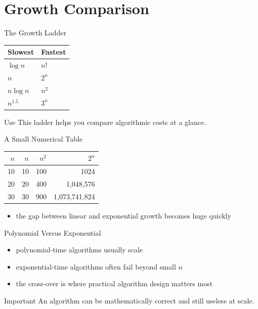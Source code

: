\documentclass[aspectratio=169,xcolor=dvipsnames]{beamer}
\begin{document}
\section{Growth Comparison}
\begin{frame}{The Growth Ladder}
  \begin{center}
  \begin{tabular}{ll}
    Slowest & Fastest \\
    \midrule
    $\log n$ & $n!$ \\
    $n$ & $2^n$ \\
    $n \log n$ & $n^2$ \\
    $n^{1.5}$ & $3^n$
  \end{tabular}
  \end{center}
  \begin{block}{Use}
    This ladder helps you compare algorithmic costs at a glance.
  \end{block}
\end{frame}

\begin{frame}{A Small Numerical Table}
  \begin{center}
  \begin{tabular}{rrrr}
    \toprule
    $n$ & $n$ & $n^2$ & $2^n$ \\
    \midrule
    10 & 10 & 100 & 1024 \\
    20 & 20 & 400 & 1,048,576 \\
    30 & 30 & 900 & 1,073,741,824 \\
    \bottomrule
  \end{tabular}
  \end{center}
  \begin{itemize}
    \item the gap between linear and exponential growth becomes huge quickly
  \end{itemize}
\end{frame}

\begin{frame}{Polynomial Versus Exponential}
  \begin{itemize}
    \item polynomial-time algorithms usually scale
    \item exponential-time algorithms often fail beyond small $n$
    \item the cross-over is where practical algorithm design matters most
  \end{itemize}
  \begin{alertblock}{Important}
    An algorithm can be mathematically correct and still useless at scale.
  \end{alertblock}
\end{frame}
\end{document}

